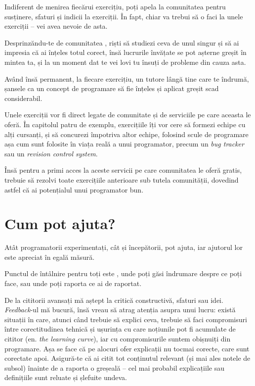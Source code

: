 Indiferent de menirea fiecărui exercițiu, poți apela la comunitatea
{\phpro} pentru susținere, sfaturi și indicii la exerciții. În fapt,
chiar va trebui să o faci la unele exerciții -- vei avea nevoie de asta.

Desprinzăndu-te de comunitatea \phpro, riști să studiezi ceva de unul
singur și să ai impresia că ai înțeles totul corect, însă lucrurile învățate
se pot așterne greșit în mintea ta, și la un moment dat te vei lovi
tu însuți de probleme din cauza asta.

Având însă permanent, la fiecare exercițiu, un tutore lângă tine care te
îndrumă, șansele ca un concept de programare să fie înțeles și aplicat
greșit scad considerabil.

Unele exerciții vor fi direct legate de comunitate și de serviciile pe care
aceasta le oferă. În capitolul patru de exemplu, exercițiile îți vor 
cere să formezi echipe cu alți cursanți, și să concurezi împotriva altor echipe, folosind
scule de programare așa cum sunt folosite în viața reală a unui programator,
precum un \textsl{bug tracker} sau un \textsl{revision control system}.

Însă pentru a primi acces la aceste servicii pe care comunitatea
{\phpro} le oferă gratis, trebuie să rezolvi toate exercițiile anterioare
sub tutela comunității, dovedind astfel că ai potențialul unui
programator bun.

\section*{Cum pot ajuta?}
{}
Atât programatorii experimentați, cât și începătorii, pot ajuta,
iar ajutorul lor este apreciat în egală măsură.

Punctul de întâlnire pentru toți este \phpro, unde poți
găsi îndrumare despre ce poți face, sau unde poți raporta
ce ai de raportat.

De la cititorii avansați mă aștept la critică constructivă, sfaturi sau idei.
\textsl{Feedback}-ul mă bucură, însă vreau să atrag atenția asupra unui lucru:
există situații în care, atunci când trebuie să explici ceva, trebuie să
faci compromisuri între corectitudinea tehnică și ușurința cu care noțiunile
pot fi acumulate de cititor (en. \textsl{the learning curve}), iar cu compromisurile
suntem obișnuiți din programare. Așa se face că pe alocuri ofer explicații
nu tocmai corecte, care sunt corectate apoi. Asigură-te că ai citit tot conținutul
relevant (și mai ales notele de subsol) înainte de a raporta o greșeală --
cel mai probabil explicațiile sau definițiile sunt reluate și șlefuite undeva.

